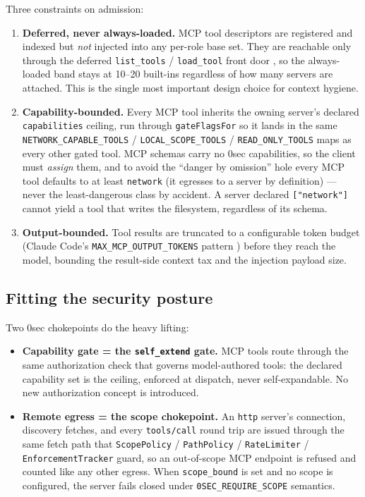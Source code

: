 \documentclass[11pt]{article}
\begin{document}
Three constraints on admission:
\begin{enumerate}[leftmargin=*]
  \item \textbf{Deferred, never always-loaded.} MCP tool descriptors are
  registered and indexed but \emph{not} injected into any per-role base set. They
  are reachable only through the deferred \texttt{list\_tools} /
  \texttt{load\_tool} front door \cite{tool-curation}, so the always-loaded band
  stays at 10--20 built-ins regardless of how many servers are attached. This is
  the single most important design choice for context hygiene.
  \item \textbf{Capability-bounded.} Every MCP tool inherits the owning server's
  declared \texttt{capabilities} ceiling, run through \texttt{gateFlagsFor} so it
  lands in the same \texttt{NETWORK\_CAPABLE\_TOOLS} / \texttt{LOCAL\_SCOPE\_TOOLS}
  / \texttt{READ\_ONLY\_TOOLS} maps as every other gated tool. MCP schemas carry
  no 0sec capabilities, so the client must \emph{assign} them, and to avoid the
  ``danger by omission'' hole every MCP tool defaults to at least
  \texttt{network} (it egresses to a server by definition) --- never the
  least-dangerous class by accident. A server declared \texttt{["network"]}
  cannot yield a tool that writes the filesystem, regardless of its schema.
  \item \textbf{Output-bounded.} Tool results are truncated to a configurable
  token budget (Claude Code's \texttt{MAX\_MCP\_OUTPUT\_TOKENS} pattern
  \cite{claudecode-mcp}) before they reach the model, bounding the result-side
  context tax and the injection payload size.
\end{enumerate}

\subsection{Fitting the security posture}

Two 0sec chokepoints do the heavy lifting:

\begin{itemize}[leftmargin=*]
  \item \textbf{Capability gate = the \texttt{self\_extend} gate.} MCP tools
  route through the same authorization check that governs model-authored tools:
  the declared capability set is the ceiling, enforced at dispatch, never
  self-expandable. No new authorization concept is introduced.
  \item \textbf{Remote egress = the scope chokepoint.} An \texttt{http} server's
  connection, discovery fetches, and every \texttt{tools/call} round trip are
  issued through the same fetch path that \texttt{ScopePolicy} /
  \texttt{PathPolicy} / \texttt{RateLimiter} / \texttt{EnforcementTracker} guard,
  so an out-of-scope MCP endpoint is refused and counted like any other egress.
  When \texttt{scope\_bound} is set and no scope is configured, the server fails
  closed under \texttt{0SEC\_REQUIRE\_SCOPE} semantics.
\end{itemize}
\end{document}
